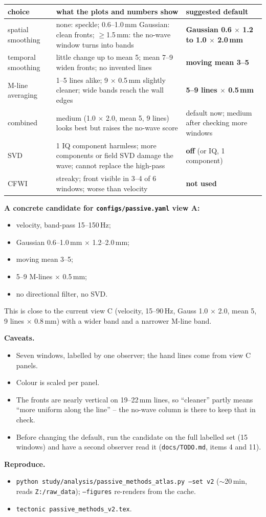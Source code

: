 \documentclass[10pt]{article}
\begin{document}
\begin{center}
\small
\begin{tabular}{p{3.4cm}p{12.4cm}p{8.2cm}}
\toprule
choice & what the plots and numbers show & suggested default \\
\midrule
spatial smoothing & none: speckle; 0.6--1.0\,mm Gaussian: clean fronts; $\geq$1.5\,mm: the
  no-wave window turns into bands & \textbf{Gaussian 0.6 $\times$ 1.2 to 1.0 $\times$ 2.0\,mm} \\
temporal smoothing & little change up to mean 5; mean 7--9 widen fronts; no invented lines &
  \textbf{moving mean 3--5} \\
M-line averaging & 1--5 lines alike; 9 $\times$ 0.5\,mm slightly cleaner; wide bands reach the
  wall edges & \textbf{5--9 lines $\times$ 0.5\,mm} \\
combined & medium (1.0 $\times$ 2.0, mean 5, 9 lines) looks best but raises the no-wave score &
  default now; medium after checking more windows \\
SVD & 1 IQ component harmless; more components or field SVD damage the wave; cannot replace the
  high-pass & \textbf{off} (or IQ, 1 component) \\
CFWI & streaky; front visible in 3--4 of 6 windows; worse than velocity & \textbf{not used} \\
\bottomrule
\end{tabular}
\end{center}

\textbf{A concrete candidate for \texttt{configs/passive.yaml} view A:}
\begin{itemize}
  \item velocity, band-pass 15--150\,Hz;
  \item Gaussian 0.6--1.0\,mm $\times$ 1.2--2.0\,mm;
  \item moving mean 3--5;
  \item 5--9 M-lines $\times$ 0.5\,mm;
  \item no directional filter, no SVD.
\end{itemize}
This is close to the current view C (velocity, 15--90\,Hz, Gauss 1.0 $\times$ 2.0, mean 5, 9 lines
$\times$ 0.8\,mm) with a wider band and a narrower M-line band.

\textbf{Caveats.}
\begin{itemize}
  \item Seven windows, labelled by one observer; the hand lines come from view C panels.
  \item Colour is scaled per panel.
  \item The fronts are nearly vertical on 19--22\,mm lines, so ``cleaner'' partly means ``more
    uniform along the line'' -- the no-wave column is there to keep that in check.
  \item Before changing the default, run the candidate on the full labelled set (15 windows) and
    have a second observer read it (\texttt{docs/TODO.md}, items 4 and 11).
\end{itemize}

\textbf{Reproduce.}
\begin{itemize}
  \item \texttt{python study/analysis/passive\_methods\_atlas.py --set v2} ($\sim$20\,min,
    reads \texttt{Z:/raw\_data}); \texttt{--figures} re-renders from the cache.
  \item \texttt{tectonic passive\_methods\_v2.tex}.
\end{itemize}
\end{document}
